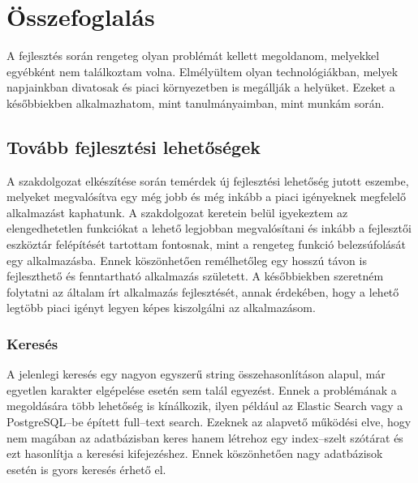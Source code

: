 \chapter{Összefoglalás}

A fejlesztés során rengeteg olyan problémát kellett megoldanom, melyekkel egyébként nem találkoztam volna.
Elmélyültem olyan technológiákban, melyek napjainkban divatosak és piaci környezetben is megállják a helyüket.
Ezeket a későbbiekben alkalmazhatom, mint tanulmányaimban, mint munkám során.

\section{Tovább fejlesztési lehetőségek}
A szakdolgozat elkészítése során temérdek új fejlesztési lehetőség jutott eszembe, melyeket megvalósítva egy még jobb és még inkább a piaci igényeknek megfelelő alkalmazást kaphatunk.
A szakdolgozat keretein belül igyekeztem az elengedhetetlen funkciókat a lehető legjobban megvalósítani és inkább a fejlesztői eszköztár felépítését tartottam fontosnak, mint a rengeteg funkció belezsúfolását egy alkalmazásba.
Ennek köszönhetően remélhetőleg egy hosszú távon is fejleszthető és fenntartható alkalmazás született.
A későbbiekben szeretném folytatni az általam írt alkalmazás fejlesztését, annak érdekében, hogy a lehető legtöbb piaci igényt legyen képes kiszolgálni az alkalmazásom.

\subsection{Keresés}
A jelenlegi keresés egy nagyon egyszerű string összehasonlításon alapul, már egyetlen karakter elgépelése esetén sem talál egyezést.
Ennek a problémának a megoldására több lehetőség is kínálkozik, ilyen például az Elastic Search vagy a PostgreSQL–be épített full–text search.
Ezeknek az alapvető működési elve, hogy nem magában az adatbázisban keres hanem létrehoz egy index–szelt szótárat és ezt hasonlítja a keresési kifejezéshez.
Ennek köszönhetően nagy adatbázisok esetén is gyors keresés érhető el.

